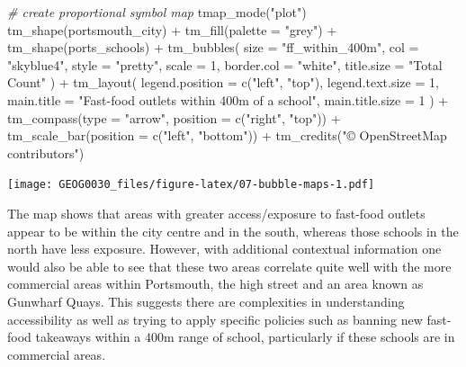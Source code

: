 \documentclass[
]{book}
\newenvironment{Shaded}{\begin{snugshade}}{\end{snugshade}}
\newcommand{\AttributeTok}[1]{\textcolor[rgb]{0.77,0.63,0.00}{#1}}
\newcommand{\CommentTok}[1]{\textcolor[rgb]{0.56,0.35,0.01}{\textit{#1}}}
\newcommand{\DecValTok}[1]{\textcolor[rgb]{0.00,0.00,0.81}{#1}}
\newcommand{\FunctionTok}[1]{\textcolor[rgb]{0.00,0.00,0.00}{#1}}
\newcommand{\NormalTok}[1]{#1}
\newcommand{\SpecialCharTok}[1]{\textcolor[rgb]{0.00,0.00,0.00}{#1}}
\newcommand{\StringTok}[1]{\textcolor[rgb]{0.31,0.60,0.02}{#1}}
\begin{document}
\begin{Shaded}
\begin{Highlighting}[]
\CommentTok{\# create proportional symbol map}
\FunctionTok{tmap\_mode}\NormalTok{(}\StringTok{"plot"}\NormalTok{)}
\FunctionTok{tm\_shape}\NormalTok{(portsmouth\_city) }\SpecialCharTok{+}
  \FunctionTok{tm\_fill}\NormalTok{(}\AttributeTok{palette =} \StringTok{"grey"}\NormalTok{) }\SpecialCharTok{+}
  \FunctionTok{tm\_shape}\NormalTok{(ports\_schools) }\SpecialCharTok{+}
  \FunctionTok{tm\_bubbles}\NormalTok{(}
    \AttributeTok{size =} \StringTok{"ff\_within\_400m"}\NormalTok{, }\AttributeTok{col =} \StringTok{"skyblue4"}\NormalTok{,}
    \AttributeTok{style =} \StringTok{"pretty"}\NormalTok{, }\AttributeTok{scale =} \DecValTok{1}\NormalTok{, }\AttributeTok{border.col =} \StringTok{"white"}\NormalTok{,}
    \AttributeTok{title.size =} \StringTok{"Total Count"}
\NormalTok{  ) }\SpecialCharTok{+}
  \FunctionTok{tm\_layout}\NormalTok{(}
    \AttributeTok{legend.position =} \FunctionTok{c}\NormalTok{(}\StringTok{"left"}\NormalTok{, }\StringTok{"top"}\NormalTok{), }\AttributeTok{legend.text.size =} \DecValTok{1}\NormalTok{,}
    \AttributeTok{main.title =} \StringTok{"Fast{-}food outlets within 400m of a school"}\NormalTok{,}
    \AttributeTok{main.title.size =} \DecValTok{1}
\NormalTok{  ) }\SpecialCharTok{+}
  \FunctionTok{tm\_compass}\NormalTok{(}\AttributeTok{type =} \StringTok{"arrow"}\NormalTok{, }\AttributeTok{position =} \FunctionTok{c}\NormalTok{(}\StringTok{"right"}\NormalTok{, }\StringTok{"top"}\NormalTok{)) }\SpecialCharTok{+}
  \FunctionTok{tm\_scale\_bar}\NormalTok{(}\AttributeTok{position =} \FunctionTok{c}\NormalTok{(}\StringTok{"left"}\NormalTok{, }\StringTok{"bottom"}\NormalTok{)) }\SpecialCharTok{+}
  \FunctionTok{tm\_credits}\NormalTok{(}\StringTok{"© OpenStreetMap contributors"}\NormalTok{)}
\end{Highlighting}
\end{Shaded}

\texttt{[image: GEOG0030\_files/figure-latex/07-bubble-maps-1.pdf]}

The map shows that areas with greater access/exposure to fast-food outlets appear to be within the city centre and in the south, whereas those schools in the north have less exposure. However, with additional contextual information one would also be able to see that these two areas correlate quite well with the more commercial areas within Portsmouth, the high street and an area known as Gunwharf Quays. This suggests there are complexities in understanding accessibility as well as trying to apply specific policies such as banning new fast-food takeaways within a 400m range of school, particularly if these schools are in commercial areas.
\end{document}
